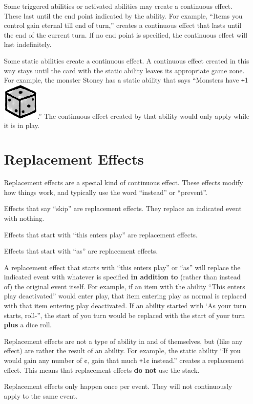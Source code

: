 \documentclass[a4paper, twoside]{report} %
\newcommand{\dice}{\includegraphics[scale=0.15]{./assets/Icon_Dice.png}}
\def\plus{\texttt{+}}
\begin{document}
    Some triggered abilities or activated abilities may create a continuous effect. These last until the end point indicated by the ability. For example, “Items you control gain eternal till end of turn,” creates a continuous effect that lasts until the end of the current turn. If no end point is specified, the continuous effect will last indefinitely.

    Some static abilities create a continuous effect. A continuous effect created in this way stays until the card with the static ability leaves its appropriate game zone. For example, the monster Stoney has a static ability that says “Monsters have \plus1 \dice.” The continuous effect created by that ability would only apply while it is in play.

    \section{Replacement Effects}
    Replacement effects are a special kind of continuous effect. These effects modify how things work, and typically use the word “instead” or “prevent”.

    Effects that say “skip” are replacement effects. They replace an indicated event with nothing.

    Effects that start with “this enters play” are replacement effects.

    Effects that start with “as” are replacement effects.

    A replacement effect that starts with “this enters play” or “as” will replace the indicated event with whatever is specified \textbf{in addition to} (rather than instead of) the original event itself. For example, if an item with the ability “This enters play deactivated” would enter play, that item entering play as normal is replaced with that item entering play deactivated. If an ability started with ‘As your turn starts, roll-”, the start of you turn would be replaced with the start of your turn \textbf{plus} a dice roll.

    Replacement effects are not a type of ability in and of themselves, but (like any effect) are rather the result of an ability. For example, the static ability “If you would gain any number of ¢, gain that much \plus1¢ instead.” creates a replacement effect. This means that replacement effects \textbf{do not} use the stack.

    Replacement effects only happen once per event. They will not continuously apply to the same event.
\end{document}
